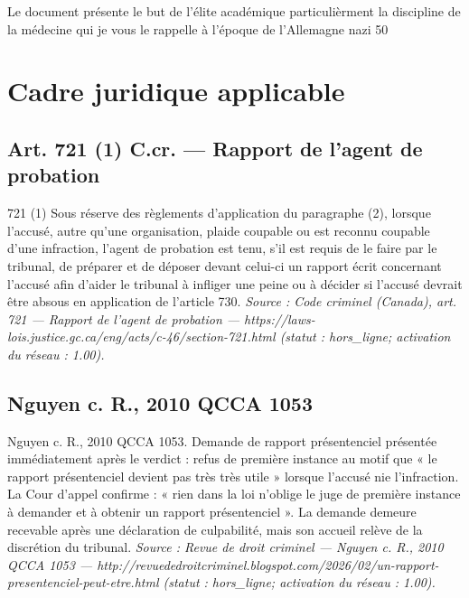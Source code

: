 \documentclass[12pt,letterpaper,oneside]{article}
\begin{document}
Le document présente le but de l'élite académique particulièrment la discipline de la médecine qui je vous le rappelle à l'époque de l'Allemagne nazi 50%


\section{Cadre juridique applicable}
\subsection*{Art. 721 (1) C.cr. — Rapport de l'agent de probation}
721 (1) Sous réserve des règlements d'application du paragraphe (2), lorsque l'accusé, autre qu'une organisation, plaide coupable ou est reconnu coupable d'une infraction, l'agent de probation est tenu, s'il est requis de le faire par le tribunal, de préparer et de déposer devant celui-ci un rapport écrit concernant l'accusé afin d'aider le tribunal à infliger une peine ou à décider si l'accusé devrait être absous en application de l'article 730.
\emph{Source : Code criminel (Canada), art. 721 — Rapport de l'agent de probation — https://laws-lois.justice.gc.ca/eng/acts/c-46/section-721.html (statut : hors\_ligne; activation du réseau : 1.00).}

\subsection*{Nguyen c. R., 2010 QCCA 1053}
Nguyen c. R., 2010 QCCA 1053. Demande de rapport présentenciel présentée immédiatement après le verdict : refus de première instance au motif que « le rapport présentenciel devient pas très très utile » lorsque l'accusé nie l'infraction. La Cour d'appel confirme : « rien dans la loi n'oblige le juge de première instance à demander et à obtenir un rapport présentenciel ». La demande demeure recevable après une déclaration de culpabilité, mais son accueil relève de la discrétion du tribunal.
\emph{Source : Revue de droit criminel — Nguyen c. R., 2010 QCCA 1053 — http://revuededroitcriminel.blogspot.com/2026/02/un-rapport-presentenciel-peut-etre.html (statut : hors\_ligne; activation du réseau : 1.00).}
\end{document}
